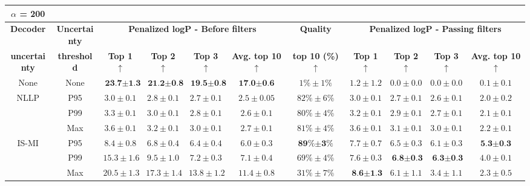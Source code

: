 \begin{table}[h]
\begin{center}
{\begin{tabular}{ccccccccccc}
\toprule
$\alpha$ = 200\\
\toprule
\textbf{Decoder} & \textbf{Uncertainty} & \multicolumn{4}{c}{\textbf{Penalized logP - Before filters}} & \textbf{Quality} & \multicolumn{4}{c}{\textbf{Penalized logP - Passing filters}} \\
\textbf{uncertainty} & \textbf{threshold} & \textbf{Top 1} $\uparrow$ & \textbf{Top 2} $\uparrow$ & \textbf{Top 3} $\uparrow$ & \textbf{Avg. top 10} $\uparrow$ & \textbf{top 10 (\%)} $\uparrow$ & \textbf{Top 1} $\uparrow$ & \textbf{Top 2} $\uparrow$ & \textbf{Top 3} $\uparrow$ & \textbf{Avg. top 10} $\uparrow$ \\
\toprule
None & None & $\textbf{23.7} \pm \textbf{1.3}$ & $\textbf{21.2} \pm \textbf{0.8}$ & $\textbf{19.5} \pm \textbf{0.8}$ & $\textbf{17.0} \pm \textbf{0.6}$ & $1\% \pm 1\% $ & $1.2 \pm 1.2$ & $0.0 \pm 0.0$ & $0.0 \pm 0.0$ & $0.1 \pm 0.1$ \\
\midrule
NLLP & P95 & $3.0 \pm 0.1$ & $2.8 \pm 0.1$ & $2.7 \pm 0.1$ & $2.5 \pm 0.05$ & $82\% \pm 6\% $ & $3.0 \pm 0.1$ & $2.7 \pm 0.1$ & $2.6 \pm 0.1$ & $2.0 \pm 0.2$ \\
 & P99 & $3.3 \pm 0.1$ & $3.0 \pm 0.1$ & $2.8 \pm 0.1$ & $2.6 \pm 0.1$ & $80\% \pm 4\% $ & $3.2 \pm 0.1$ & $2.9 \pm 0.1$ & $2.7 \pm 0.1$ & $2.1 \pm 0.1$ \\
 & Max & $3.6 \pm 0.1$ & $3.2 \pm 0.1$ & $3.0 \pm 0.1$ & $2.7 \pm 0.1$ & $81\% \pm 4\% $ & $3.6 \pm 0.1$ & $3.1 \pm 0.1$ & $3.0 \pm 0.1$ & $2.2 \pm 0.1$ \\
\midrule
IS-MI & P95 & $8.4 \pm 0.8$ & $6.8 \pm 0.4$ & $6.4 \pm 0.4$ & $6.0 \pm 0.3$ & $\textbf{89\%} \pm \textbf{3\%} $ & $7.7 \pm 0.7$ & $6.5 \pm 0.3$ & $6.1 \pm 0.3$ & $\textbf{5.3} \pm \textbf{0.3}$ \\
 & P99 & $15.3 \pm 1.6$ & $9.5 \pm 1.0$ & $7.2 \pm 0.3$ & $7.1 \pm 0.4$ & $69\% \pm 4\% $ & $7.6 \pm 0.3$ & $\textbf{6.8} \pm \textbf{0.3}$ & $\textbf{6.3} \pm \textbf{0.3}$ & $4.0 \pm 0.1$ \\
 & Max & $20.5 \pm 1.3$ & $17.3 \pm 1.4$ & $13.8 \pm 1.2$ & $11.4 \pm 0.8$ & $31\% \pm 7\% $ & $\textbf{8.6} \pm \textbf{1.3}$ & $6.1 \pm 1.1$ & $3.4 \pm 1.1$ & $2.3 \pm 0.5$ \\
\bottomrule
\end{tabular}
}
\label{Appendix_E_Table_JTVAE_GA_results}
\end{center}
\end{table}